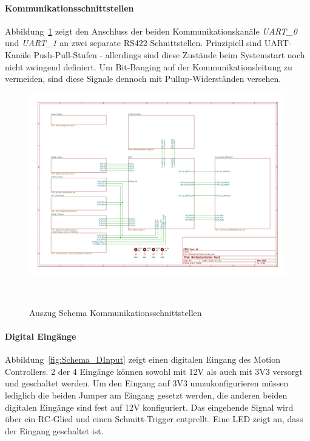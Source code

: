 \documentclass[main.  tex]{subfiles} %
\begin{document}
\newpage

\paragraph{Kommunikationsschnittstellen}
Abbildung~\ref{fig:Schema_Kommunikation} zeigt den Anschluss der beiden
Kommunikationskanäle \textit{UART\_0} und \textit{UART\_1} an zwei separate
RS422-Schnittstellen. Prinzipiell sind UART-Kanäle Push-Pull-Stufen -
allerdings sind diese Zustände beim Systemstart noch nicht zwingend definiert.
Um Bit-Banging auf der Kommunikationsleitung zu vermeiden, sind diese Signale
dennoch mit Pullup-Widerständen versehen.

\begin{figure}[H]
    \centering
    \includegraphics[page=4,width=\textwidth]{../Anhang_pdfs/MotionController.pdf}
    \caption{Auszug Schema Kommunikationsschnittstellen}~\label{fig:Schema_Kommunikation}
\end{figure}

\newpage

\paragraph{Digital Eingänge}
Abbildung~\ref{fig:Schema_DInput} zeigt einen digitalen Eingang des Motion
Controllers. 2 der 4 Eingänge können sowohl mit 12V als auch mit 3V3 versorgt
und geschaltet werden. Um den Eingang auf 3V3 umzukonfigurieren müssen
lediglich die beiden Jumper am Eingang gesetzt werden, die anderen beiden
digitalen Eingänge sind fest auf 12V konfiguriert. Das eingehende Signal wird
über ein RC-Glied und einen Schmitt-Trigger entprellt. Eine LED zeigt an, dass
der Eingang geschaltet ist.
\end{document}
